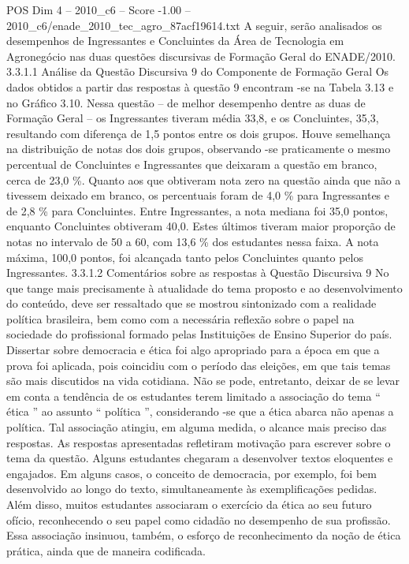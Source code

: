 \begin{textsample}{POS Dim 4 – 2010\_c6 – Score -1.00 – 2010\_c6/enade\_2010\_tec\_agro\_87acf19614.txt}
A seguir, serão analisados os desempenhos de Ingressantes e Concluintes da Área de Tecnologia em Agronegócio nas duas questões discursivas de Formação Geral do ENADE/2010. 3.3.1.1 Análise da Questão Discursiva 9 do Componente de Formação Geral Os dados obtidos a partir das respostas à questão 9 encontram -se na Tabela 3.13 e no Gráfico 3.10.
Nessa questão – de melhor desempenho dentre as duas de Formação Geral – os Ingressantes tiveram média 33,8, e os Concluintes, 35,3, resultando com diferença de 1,5 pontos entre os dois grupos.
Houve semelhança na distribuição de notas dos dois grupos, observando -se praticamente o mesmo percentual de Concluintes e Ingressantes que deixaram a questão em branco, cerca de 23,0 \%.
Quanto aos que obtiveram nota zero na questão ainda que não a tivessem deixado em branco, os percentuais foram de 4,0 \% para Ingressantes e de 2,8 \% para Concluintes.
Entre Ingressantes, a nota mediana foi 35,0 pontos, enquanto Concluintes obtiveram 40,0.
Estes últimos tiveram maior proporção de notas no intervalo de 50 a 60, com 13,6 \% dos estudantes nessa faixa.
A nota máxima, 100,0 pontos, foi alcançada tanto pelos Concluintes quanto pelos Ingressantes. 3.3.1.2 Comentários sobre as respostas à Questão Discursiva 9 No que tange mais precisamente à atualidade do tema proposto e ao desenvolvimento do conteúdo, deve ser ressaltado que se mostrou sintonizado com a realidade política brasileira, bem como com a necessária reflexão sobre o papel na sociedade do profissional formado pelas Instituições de Ensino Superior do país.
Dissertar sobre democracia e ética foi algo apropriado para a época em que a prova foi aplicada, pois coincidiu com o período das eleições, em que tais temas são mais discutidos na vida cotidiana.
Não se pode, entretanto, deixar de se levar em conta a tendência de os estudantes terem limitado a associação do tema “ ética ” ao assunto “ política ”, considerando -se que a ética abarca não apenas a política.
Tal associação atingiu, em alguma medida, o alcance mais preciso das respostas.
As respostas apresentadas refletiram motivação para escrever sobre o tema da questão.
Alguns estudantes chegaram a desenvolver textos eloquentes e engajados.
Em alguns casos, o conceito de democracia, por exemplo, foi bem desenvolvido ao longo do texto, simultaneamente às exemplificações pedidas.
Além disso, muitos estudantes associaram o exercício da ética ao seu futuro ofício, reconhecendo o seu papel como cidadão no desempenho de sua profissão.
Essa associação insinuou, também, o esforço de reconhecimento da noção de ética prática, ainda que de maneira codificada.

\end{textsample}
